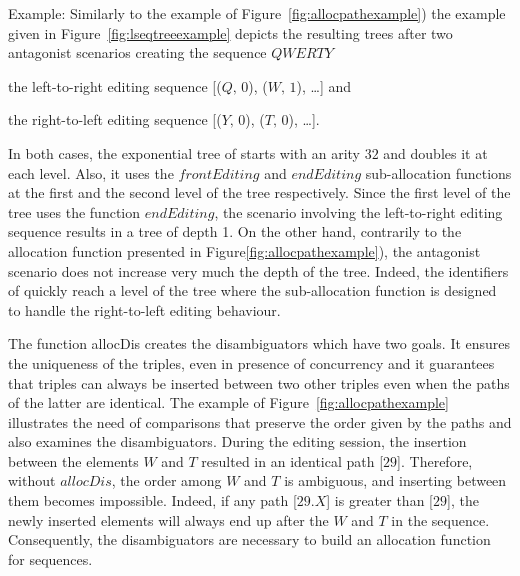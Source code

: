 \begin{asparadesc}
\item[Example:] Similarly to the example of Figure~\ref{fig:allocpathexample})
  the example given in Figure~\ref{fig:lseqtreeexample} depicts the resulting
  trees after two antagonist scenarios creating the sequence
  $QWERTY$ \begin{inparaenum}[(i)] \item the left-to-right editing sequence
    [($Q,\,0$), ($W,\,1$), \ldots] and \item the right-to-left editing sequence
    [($Y,\,0$), ($T,\,0$), \ldots]. \end{inparaenum} In both cases, the
  exponential tree of \LSEQ starts with an arity $32$ and doubles it at each
  level. Also, it uses the $frontEditing$ and $endEditing$ sub-allocation
  functions at the first and the second level of the tree respectively. Since
  the first level of the tree uses the function $endEditing$, the scenario
  involving the left-to-right editing sequence results in a tree of depth 1. On
  the other hand, contrarily to the allocation function presented in
  Figure\ref{fig:allocpathexample}), the antagonist scenario does not increase
  very much the depth of the tree. Indeed, the identifiers of \LSEQ quickly
  reach a level of the tree where the sub-allocation function is designed to
  handle the right-to-left editing behaviour.
\end{asparadesc}

\begin{asparadesc}
\item [The function allocDis] creates the di\-sam\-bi\-gua\-tors which have two
  goals.  It ensures the uniqueness of the triples, even in presence of
  concurrency and it guarantees that triples can always be inserted between two
  other triples even when the paths of the latter are identical. The example of
  Figure~\ref{fig:allocpathexample} illustrates the need of comparisons that
  preserve the order given by the paths and also examines the
  disambiguators. During the editing session, the insertion between the
  elements $W$ and $T$ resulted in an identical path [$29$]. Therefore, without
  $allocDis$, the order among $W$ and $T$ is ambiguous, and inserting between
  them becomes impossible. Indeed, if any path [$29.X$] is greater than [$29$],
  the newly inserted elements will always end up after the $W$ and $T$ in the
  sequence. Consequently, the disambiguators are necessary to build an
  allocation function for sequences.
\end{asparadesc}

